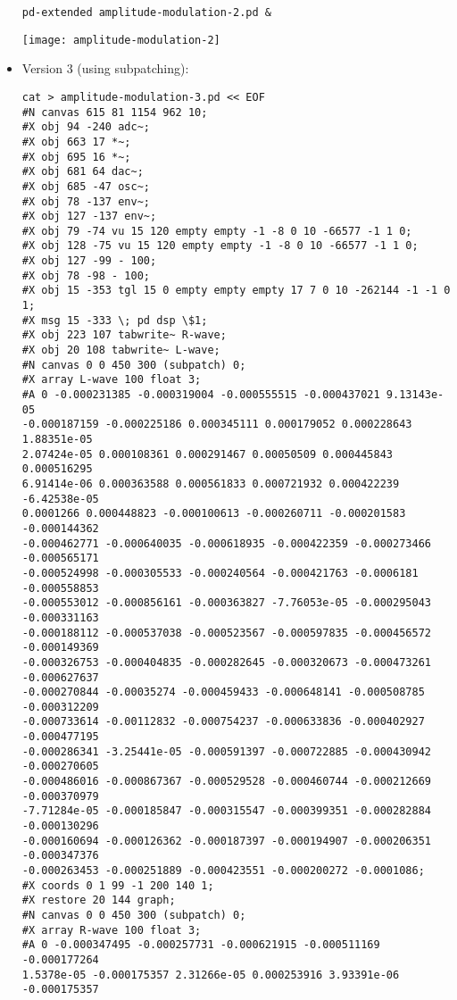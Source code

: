 \begin{itemize}
\begin{verbatim}
pd-extended amplitude-modulation-2.pd &
\end{verbatim}

\begin{center}
  \texttt{[image: amplitude-modulation-2]}
\end{center}

\item Version 3 (using subpatching):

\begin{verbatim}
cat > amplitude-modulation-3.pd << EOF
#N canvas 615 81 1154 962 10;
#X obj 94 -240 adc~;
#X obj 663 17 *~;
#X obj 695 16 *~;
#X obj 681 64 dac~;
#X obj 685 -47 osc~;
#X obj 78 -137 env~;
#X obj 127 -137 env~;
#X obj 79 -74 vu 15 120 empty empty -1 -8 0 10 -66577 -1 1 0;
#X obj 128 -75 vu 15 120 empty empty -1 -8 0 10 -66577 -1 1 0;
#X obj 127 -99 - 100;
#X obj 78 -98 - 100;
#X obj 15 -353 tgl 15 0 empty empty empty 17 7 0 10 -262144 -1 -1 0
1;
#X msg 15 -333 \; pd dsp \$1;
#X obj 223 107 tabwrite~ R-wave;
#X obj 20 108 tabwrite~ L-wave;
#N canvas 0 0 450 300 (subpatch) 0;
#X array L-wave 100 float 3;
#A 0 -0.000231385 -0.000319004 -0.000555515 -0.000437021 9.13143e-05
-0.000187159 -0.000225186 0.000345111 0.000179052 0.000228643 1.88351e-05
2.07424e-05 0.000108361 0.000291467 0.00050509 0.000445843 0.000516295
6.91414e-06 0.000363588 0.000561833 0.000721932 0.000422239 -6.42538e-05
0.0001266 0.000448823 -0.000100613 -0.000260711 -0.000201583 -0.000144362
-0.000462771 -0.000640035 -0.000618935 -0.000422359 -0.000273466 -0.000565171
-0.000524998 -0.000305533 -0.000240564 -0.000421763 -0.0006181 -0.000558853
-0.000553012 -0.000856161 -0.000363827 -7.76053e-05 -0.000295043 -0.000331163
-0.000188112 -0.000537038 -0.000523567 -0.000597835 -0.000456572 -0.000149369
-0.000326753 -0.000404835 -0.000282645 -0.000320673 -0.000473261 -0.000627637
-0.000270844 -0.00035274 -0.000459433 -0.000648141 -0.000508785 -0.000312209
-0.000733614 -0.00112832 -0.000754237 -0.000633836 -0.000402927 -0.000477195
-0.000286341 -3.25441e-05 -0.000591397 -0.000722885 -0.000430942 -0.000270605
-0.000486016 -0.000867367 -0.000529528 -0.000460744 -0.000212669 -0.000370979
-7.71284e-05 -0.000185847 -0.000315547 -0.000399351 -0.000282884 -0.000130296
-0.000160694 -0.000126362 -0.000187397 -0.000194907 -0.000206351 -0.000347376
-0.000263453 -0.000251889 -0.000423551 -0.000200272 -0.0001086;
#X coords 0 1 99 -1 200 140 1;
#X restore 20 144 graph;
#N canvas 0 0 450 300 (subpatch) 0;
#X array R-wave 100 float 3;
#A 0 -0.000347495 -0.000257731 -0.000621915 -0.000511169 -0.000177264
1.5378e-05 -0.000175357 2.31266e-05 0.000253916 3.93391e-06 -0.000175357

\end{verbatim}
\end{itemize}
